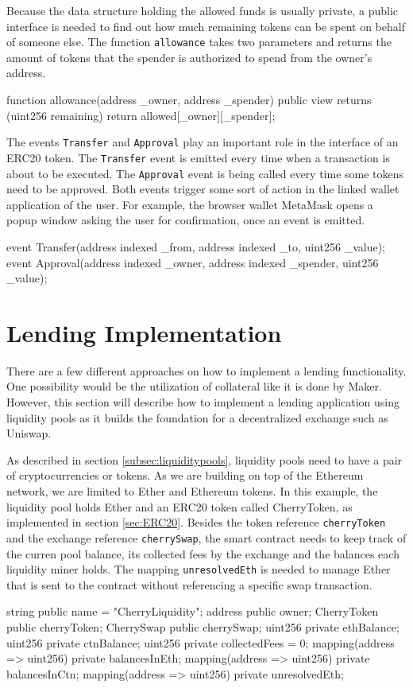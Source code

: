 Because the data structure holding the allowed funds is usually private, a public interface is needed to find out how much remaining tokens can be spent on behalf of someone else. The function \texttt{allowance} takes two parameters and returns the amount of tokens that the spender is authorized to spend from the owner's address.
\begin{GenericCode}
function allowance(address _owner, address _spender) public view returns (uint256 remaining) {
  return allowed[_owner][_spender];
}
\end{GenericCode}

The events \texttt{Transfer} and \texttt{Approval} play an important role in the interface of an ERC20 token. The \texttt{Transfer} event is emitted every time when a transaction is about to be executed. The \texttt{Approval} event is being called every time some tokens need to be approved. Both events trigger some sort of action in the linked wallet application of the user. For example, the browser wallet MetaMask opens a popup window asking the user for confirmation, once an event is emitted. 
\begin{GenericCode}
event Transfer(address indexed _from, address indexed _to, uint256 _value);
event Approval(address indexed _owner, address indexed _spender, uint256 _value);
\end{GenericCode}

\section{Lending Implementation}
There are a few different approaches on how to implement a lending functionality. One possibility would be the utilization of collateral like it is done by Maker\cite{MakerDAO2021}. However, this section will describe how to implement a lending application using liquidity pools as it builds the foundation for a decentralized exchange such as Uniswap\cite{Uniswap2020}.

As described in section \ref{subsec:liquiditypools}, liquidity pools need to have a pair of cryptocurrencies or tokens. As we are building on top of the Ethereum network, we are limited to Ether and Ethereum tokens. In this example, the liquidity pool holds Ether and an ERC20 token called CherryToken, as implemented in section \ref{sec:ERC20}. Besides the token reference \texttt{cherryToken} and the exchange reference \texttt{cherrySwap}, the smart contract needs to keep track of the curren pool balance, its collected fees by the exchange and the balances each liquidity miner holds. The mapping \texttt{unresolvedEth} is needed to manage Ether that is sent to the contract without referencing a specific swap transaction.
\begin{GenericCode}
string public name = "CherryLiquidity";
address public owner;
CherryToken public cherryToken;
CherrySwap public cherrySwap;
uint256 private ethBalance;
uint256 private ctnBalance;
uint256 private collectedFees = 0;
mapping(address => uint256) private balancesInEth;
mapping(address => uint256) private balancesInCtn;
mapping(address => uint256) private unresolvedEth;
\end{GenericCode}

